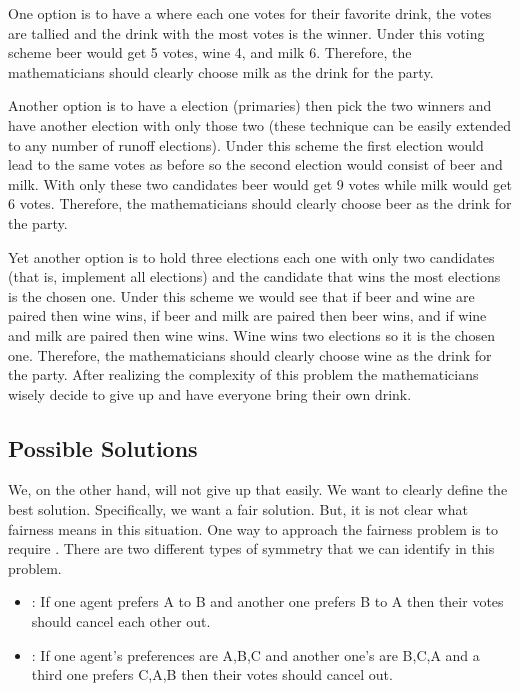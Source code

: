 One option is to have a  where each one votes for
their favorite drink, the votes are tallied and the drink with the
most votes is the winner. Under this voting scheme beer would get 5
votes, wine 4, and milk 6. Therefore, the mathematicians should
clearly choose milk as the drink for the party.

Another option is to have a  election (primaries) then
pick the two winners and have another election with only those two
(these technique can be easily extended to any number of runoff
elections). Under this scheme the first election would lead to the
same votes as before so the second election would consist of beer and
milk. With only these two candidates beer would get 9 votes while milk
would get 6 votes. Therefore, the mathematicians should clearly choose
beer as the drink for the party.

Yet another option is to hold three elections each one with only two
candidates (that is, implement all  elections) and the
candidate that wins the most elections is the chosen one. Under this
scheme we would see that if beer and wine are paired then wine wins,
if beer and milk are paired then beer wins, and if wine and milk are
paired then wine wins. Wine wins two elections so it is the chosen
one. Therefore, the mathematicians should clearly choose wine as the
drink for the party. After realizing the complexity of this problem
the mathematicians wisely decide to give up and have everyone bring
their own drink.

\subsection{Possible Solutions}

We, on the other hand, will not give up that easily. We want to
clearly define the best solution. Specifically, we want a fair
solution.  But, it is not clear what fairness means in this situation.
One way to approach the fairness problem is to require .
There are two different types of symmetry that we can identify in this
problem.

\begin{itemize}
\item \emph{}: If one agent prefers A to B and
  another one prefers B to A then their votes should cancel each
  other out.
\item \emph{}: If one agent's preferences are A,B,C
  and another one's are B,C,A and a third one prefers C,A,B then their
  votes should cancel out.
\end{itemize}

